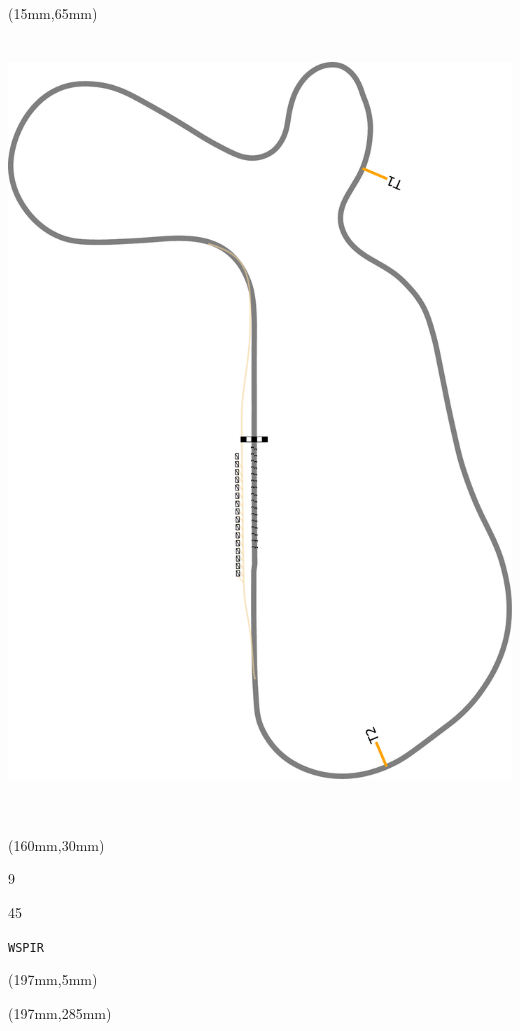 \begin{textblock*}{185mm}(15mm,65mm)%
\centering
\mbox{\includegraphics[width=185mm,height=210mm,keepaspectratio]{PT/WSPIR.pdf}}
\end{textblock*}
\begin{textblock*}{40mm}(160mm,30mm)%
\Large
\par{} 
\par9 
\par45 
\par\hfill\tiny\tt WSPIR\\
\end{textblock*}
\begin{textblock*}{20mm}(197mm,5mm)%
\fbox{\thepage}
\label{WSPIR}
\end{textblock*}
\begin{textblock*}{20mm}(197mm,285mm)%
\fbox{\thepage}
\end{textblock*}

